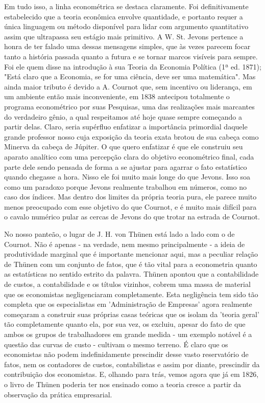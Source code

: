 \documentclass[12pt]{article}
\begin{document}
Em tudo isso, a linha econométrica se destaca claramente. Foi definitivamente estabelecido que a teoria econômica envolve quantidade, e portanto requer a única linguagem ou método disponível para lidar com argumento quantitativo assim que ultrapassa seu estágio mais primitivo. A W. St. Jevons pertence a honra de ter falado uma dessas mensagens simples, que às vezes parecem focar tanto a história passada quanto a futura e se tornar marcos visíveis para sempre. Foi ele quem disse na introdução à sua Teoria da Economia Política (1ª ed. 1871); "Está claro que a Economia, se for uma ciência, deve ser uma matemática". Mas ainda maior tributo é devido a A. Cournot que, sem incentivo ou liderança, em um ambiente então mais inconveniente, em 1838 antecipou totalmente o programa econométrico por suas Pesquisas, uma das realizações mais marcantes do verdadeiro gênio, a qual respeitamos até hoje quase sempre começando a partir delas. Claro, seria supérfluo enfatizar a importância primordial daquele grande professor nosso cuja exposição da teoria exata brotou de sua cabeça como Minerva da cabeça de Júpiter. O que quero enfatizar é que ele construiu seu aparato analítico com uma percepção clara do objetivo econométrico final, cada parte dele sendo pensada de forma a se ajustar para agarrar o fato estatístico quando chegasse a hora. Nisso ele foi muito mais longe do que Jevons. Isso soa como um paradoxo porque Jevons realmente trabalhou em números, como no caso dos índices. Mas dentro dos limites da própria teoria pura, ele parece muito menos preocupado com esse objetivo do que Cournot, e é muito mais difícil para o cavalo numérico pular as cercas de Jevons do que trotar na estrada de Cournot.

No nosso panteão, o lugar de J. H. von Thünen está lado a lado com o de Cournot. Não é apenas - na verdade, nem mesmo principalmente - a ideia de produtividade marginal que é importante mencionar aqui, mas a peculiar relação de Thünen com um conjunto de fatos, que é tão vital para a econometria quanto as estatísticas no sentido estrito da palavra. Thünen apontou que a contabilidade de custos, a contabilidade e os títulos vizinhos, cobrem uma massa de material que os economistas negligenciaram completamente. Esta negligência tem sido tão completa que os especialistas em 'Administração de Empresas' agora realmente começaram a construir suas próprias casas teóricas que os isolam da 'teoria geral' tão completamente quanto ela, por sua vez, os excluiu, apesar do fato de que ambos os grupos de trabalhadores em grande medida - um exemplo notável é a questão das curvas de custo - cultivam o mesmo terreno. É claro que os economistas não podem indefinidamente prescindir desse vasto reservatório de fatos, nem os contadores de custos, contabilistas e assim por diante, prescindir da contribuição dos economistas. E, olhando para trás, vemos agora que já em 1826, o livro de Thünen poderia ter nos ensinado como a teoria cresce a partir da observação da prática empresarial.
\end{document}
